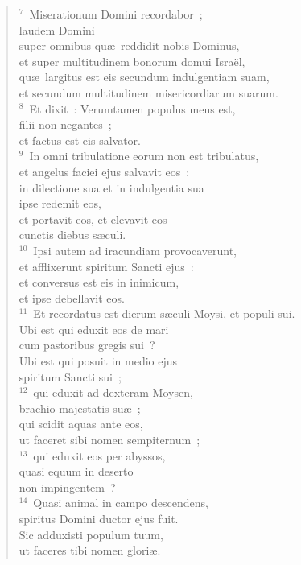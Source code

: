\begin{verse}${}^{7}$~Miserationum Domini recordabor~;\\ laudem Domini\\ super omnibus qu\ae\ reddidit nobis Dominus,\\ et super multitudinem bonorum domui Isra\"el,\\ qu\ae\ largitus est eis secundum indulgentiam suam,\\ et secundum multitudinem misericordiarum suarum.\\
${}^{8}$~Et dixit~: Verumtamen populus meus est,\\ filii non negantes~;\\ et factus est eis salvator.\\
${}^{9}$~In omni tribulatione eorum non est tribulatus,\\ et angelus faciei ejus salvavit eos~:\\ in dilectione sua et in indulgentia sua\\ ipse redemit eos,\\ et portavit eos, et elevavit eos\\ cunctis diebus s\ae culi.\\
${}^{10}$~Ipsi autem ad iracundiam provocaverunt,\\ et afflixerunt spiritum Sancti ejus~:\\ et conversus est eis in inimicum,\\ et ipse debellavit eos.\\
${}^{11}$~Et recordatus est dierum s\ae culi Moysi, et populi sui.\\ Ubi est qui eduxit eos de mari\\ cum pastoribus gregis sui~?\\ Ubi est qui posuit in medio ejus\\ spiritum Sancti sui~;\\
${}^{12}$~qui eduxit ad dexteram Moysen,\\ brachio majestatis su\ae~;\\ qui scidit aquas ante eos,\\ ut faceret sibi nomen sempiternum~;\\
${}^{13}$~qui eduxit eos per abyssos,\\ quasi equum in deserto\\ non impingentem~?\\
${}^{14}$~Quasi animal in campo descendens,\\ spiritus Domini ductor ejus fuit.\\ Sic adduxisti populum tuum,\\ ut faceres tibi nomen glori\ae .\\

\end{verse}
